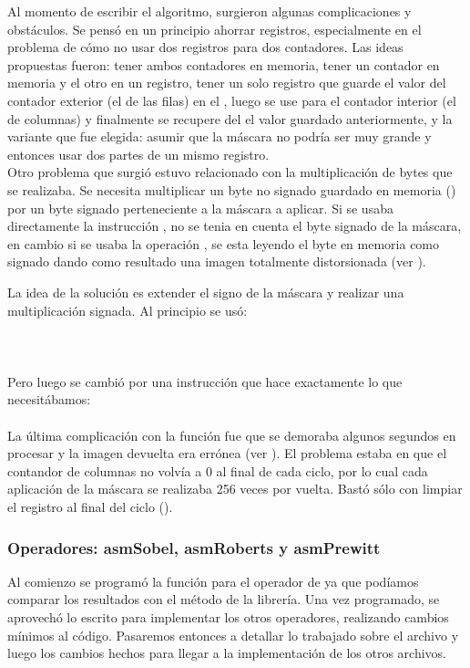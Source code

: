 Al momento de escribir el algoritmo, surgieron algunas complicaciones y obst\'aculos. Se pens\'o en un principio 
ahorrar registros, especialmente en el problema de c\'omo no usar dos registros para dos contadores. Las ideas 
propuestas fueron: tener ambos contadores en memoria, tener un contador en memoria y el otro en un registro, 
tener un solo registro que guarde el valor del contador exterior (el de las filas) en el , luego se use 
para el contador interior (el de columnas) y finalmente se recupere del  el valor guardado 
anteriormente, y la variante que fue elegida: asumir que la m\'ascara no podr\'ia ser muy grande y entonces usar 
dos partes de un mismo registro.\\

Otro problema que surgi\'o estuvo relacionado con la multiplicaci\'on de bytes que se realizaba. Se necesita 
multiplicar un byte no signado guardado en memoria (\code{[esi]}) por un byte signado perteneciente a la m\'ascara 
a aplicar. Si se usaba directamente la instrucci\'on , no se tenia en cuenta el byte signado de la m\'ascara, 
en cambio si se usaba la operaci\'on , se esta leyendo el byte en memoria como signado dando como resultado
una imagen totalmente distorsionada (ver ).

La idea de la soluci\'on es extender el signo de la m\'ascara y realizar una multiplicaci\'on signada. Al principio 
se us\'o: \\
\indent{}\\
\indent{}\\
\indent{} \\
Pero luego se cambi\'o por una instrucci\'on que hace exactamente lo que necesit\'abamos:\\
\indent{}\\
La \'ultima complicaci\'on con la funci\'on fue que se demoraba algunos segundos en procesar y la imagen devuelta era
err\'onea (ver ). El problema estaba en que el contandor de columnas no volv\'ia a 0 al final de cada ciclo, por lo cual cada 
aplicaci\'on de la m\'ascara se realizaba 256 veces por vuelta. Bast\'o s\'olo con limpiar el registro al final del
ciclo ().

\vspace{1cm}
\subsubsection{Operadores: asmSobel, asmRoberts y asmPrewitt}
Al comienzo se program\'o la funci\'on para el operador de  ya que pod\'iamos comparar los resultados con el 
m\'etodo  de la librer\'ia. Una vez programado, se aprovech\'o lo escrito para implementar los otros 
operadores, realizando cambios m\'inimos al c\'odigo. Pasaremos entonces a detallar lo trabajado sobre el archivo 
 y luego los cambios hechos para llegar a la implementaci\'on de los otros archivos.\\

